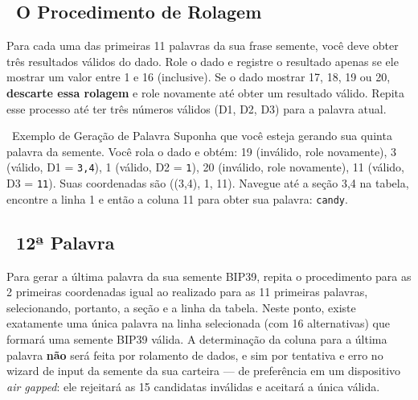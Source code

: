\documentclass[10pt]{article}
\begin{document}
\subsection*{~O Procedimento de Rolagem}

Para cada uma das primeiras 11 palavras da sua frase semente, você deve obter três resultados válidos do dado. Role o dado e registre o resultado apenas se ele mostrar um valor entre 1 e 16 (inclusive). Se o dado mostrar 17, 18, 19 ou 20, \textbf{descarte essa rolagem} e role novamente até obter um resultado válido. Repita esse processo até ter três números válidos (D1, D2, D3) para a palavra atual.

\begin{examplebox}{\faLightbulb~Exemplo de Geração de Palavra}
Suponha que você esteja gerando sua quinta palavra da semente. Você rola o dado e obtém: 19 (inválido, role novamente), 3 (válido, D1 = \texttt{3,4}), 1 (válido, D2 = \texttt{1}), 20 (inválido, role novamente), 11 (válido, D3 = \texttt{11}). Suas coordenadas são ((3,4), 1, 11). Navegue até a seção 3,4 na tabela, encontre a linha 1 e então a coluna 11 para obter sua palavra: \texttt{candy}.
\end{examplebox}

\subsection*{\faPen~12ª Palavra}

Para gerar a última palavra da sua semente BIP39, repita o procedimento para as 2 primeiras coordenadas igual ao realizado para as 11 primeiras palavras, selecionando, portanto, a seção e a linha da tabela. Neste ponto, existe exatamente uma única palavra na linha selecionada (com 16 alternativas) que formará uma semente BIP39 válida. A determinação da coluna para a última palavra \textbf{não} será feita por rolamento de dados, e sim por tentativa e erro no wizard de input da semente da sua carteira --- de preferência em um dispositivo \textit{air gapped}: ele rejeitará as 15 candidatas inválidas e aceitará a única válida.
\end{document}
